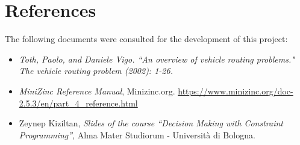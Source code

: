 \documentclass[main.tex]{subfiles}
\begin{document}
\section{References}
\label{sec:references}

The following documents were consulted for the development of this project:
\begin{itemize}
    \item \textit{Toth, Paolo, and Daniele Vigo. ``An overview of vehicle routing problems." The vehicle routing problem (2002): 1-26.}
    \item \textit{MiniZinc Reference Manual}, Minizinc.org. \href{https://www.minizinc.org/doc-2.5.3/en/part_4_reference.html}{https://www.minizinc.org/doc-2.5.3/en/part\_4\_reference.html}
    \item Zeynep Kiziltan, \textit{Slides of the course ``Decision Making with Constraint Programming''}, Alma Mater Studiorum - Università di Bologna.
\end{itemize}
\end{document}
